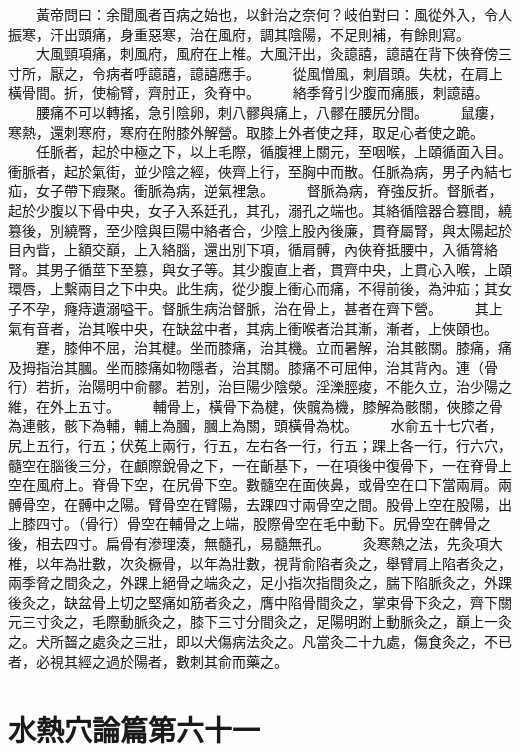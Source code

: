 　　黃帝問曰：余聞風者百病之始也，以針治之奈何？岐伯對曰：風從外入，令人振寒，汗出頭痛，身重惡寒，治在風府，調其陰陽，不足則補，有餘則寫。
　　大風頸項痛，刺風府，風府在上椎。大風汗出，灸譩譆，譩譆在背下俠脊傍三寸所，厭之，令病者呼譩譆，譩譆應手。
　　從風憎風，刺眉頭。失枕，在肩上橫骨間。折，使榆臂，齊肘正，灸脊中。
　　絡季脅引少腹而痛脹，刺譩譆。
　　腰痛不可以轉搖，急引陰卵，刺八髎與痛上，八髎在腰尻分間。
　　鼠瘻，寒熱，還刺寒府，寒府在附膝外解營。取膝上外者使之拜，取足心者使之跪。
　　任脈者，起於中極之下，以上毛際，循腹裡上關元，至咽喉，上頤循面入目。衝脈者，起於氣街，並少陰之經，俠齊上行，至胸中而散。任脈為病，男子內結七疝，女子帶下瘕聚。衝脈為病，逆氣裡急。
　　督脈為病，脊強反折。督脈者，起於少腹以下骨中央，女子入系廷孔，其孔，溺孔之端也。其絡循陰器合篡間，繞篡後，別繞臀，至少陰與巨陽中絡者合，少陰上股內後廉，貫脊屬腎，與太陽起於目內眥，上額交巔，上入絡腦，還出別下項，循肩髆，內俠脊抵腰中，入循膂絡腎。其男子循莖下至篡，與女子等。其少腹直上者，貫齊中央，上貫心入喉，上頤環唇，上繫兩目之下中央。此生病，從少腹上衝心而痛，不得前後，為沖疝；其女子不孕，癃痔遺溺嗌干。督脈生病治督脈，治在骨上，甚者在齊下營。
　　其上氣有音者，治其喉中央，在缺盆中者，其病上衝喉者治其漸，漸者，上俠頤也。
　　蹇，膝伸不屈，治其楗。坐而膝痛，治其機。立而暑解，治其骸關。膝痛，痛及拇指治其膕。坐而膝痛如物隱者，治其關。膝痛不可屈伸，治其背內。連（骨行）若折，治陽明中俞髎。若別，治巨陽少陰滎。淫濼脛痠，不能久立，治少陽之維，在外上五寸。
　　輔骨上，橫骨下為楗，俠髖為機，膝解為骸關，俠膝之骨為連骸，骸下為輔，輔上為膕，膕上為關，頭橫骨為枕。
　　水俞五十七穴者，尻上五行，行五；伏菟上兩行，行五，左右各一行，行五；踝上各一行，行六穴，髓空在腦後三分，在顱際銳骨之下，一在齗基下，一在項後中復骨下，一在脊骨上空在風府上。脊骨下空，在尻骨下空。數髓空在面俠鼻，或骨空在口下當兩肩。兩髆骨空，在髆中之陽。臂骨空在臂陽，去踝四寸兩骨空之間。股骨上空在股陽，出上膝四寸。（骨行）骨空在輔骨之上端，股際骨空在毛中動下。尻骨空在髀骨之後，相去四寸。扁骨有滲理湊，無髓孔，易髓無孔。
　　灸寒熱之法，先灸項大椎，以年為壯數，次灸橛骨，以年為壯數，視背俞陷者灸之，舉臂肩上陷者灸之，兩季脅之間灸之，外踝上絕骨之端灸之，足小指次指間灸之，腨下陷脈灸之，外踝後灸之，缺盆骨上切之堅痛如筋者灸之，膺中陷骨間灸之，掌束骨下灸之，齊下關元三寸灸之，毛際動脈灸之，膝下三寸分間灸之，足陽明跗上動脈灸之，巔上一灸之。犬所齧之處灸之三壯，即以犬傷病法灸之。凡當灸二十九處，傷食灸之，不已者，必視其經之過於陽者，數刺其俞而藥之。


\section{水熱穴論篇第六十一}

